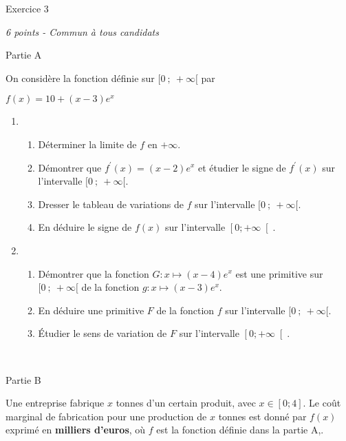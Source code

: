 
%
\begin{h2}Exercice 3\end{h2}
\textit{6 points - Commun à tous candidats }
\begin{h3}Partie A\end{h3}
On considère la fonction définie sur $ [ 0~;~+\infty [ $ par

\begin{center}
$f\left(x\right)= 10+\left(x-3\right)e^{x}$
\end{center}

\begin{enumerate}
     \item
     \begin{enumerate}[label=\alph*.]
          \item
          Déterminer la limite de $f$ en $+ \infty $.
          \item
          Démontrer que $f^{\prime}\left(x\right)=\left(x-2\right)e^{x}$ et étudier le signe de $f^{\prime}\left(x\right)$ sur l'intervalle $ [ 0~;~+\infty [ $.
          \item
          Dresser le tableau de variations de $ f $ sur l'intervalle $ [ 0~;~+\infty [ $.
          \item
          En déduire le signe de $f\left(x\right)$ sur l'intervalle $\left[0  ; +\infty \right[$.
     \end{enumerate}
     \item
     \begin{enumerate}[label=\alph*.]
          \item
          Démontrer que la fonction $G : x \mapsto   \left(x-4 \right)e^{x}$ est une primitive sur $ [ 0~;~+\infty [ $ de la fonction $g : x \mapsto  \left(x-3 \right)e^{x}$.
          \item
          En déduire une primitive $F$ de la fonction $f$ sur l'intervalle $ [ 0~;~+\infty [ $.
          \item
          Étudier le sens de variation de $F$ sur l'intervalle $\left[0  ; +\infty \right[$.
     \end{enumerate}
\end{enumerate}
 
\begin{h3}Partie B\end{h3}
Une entreprise fabrique $x$ tonnes d'un certain produit, avec $x\in \left[0  ; 4\right]$. Le coût marginal de fabrication pour une production de $x$ tonnes est donné par $f\left(x\right)$ exprimé en \textbf{milliers d'euros}, où $f$ est la fonction définie dans la partie A,.
